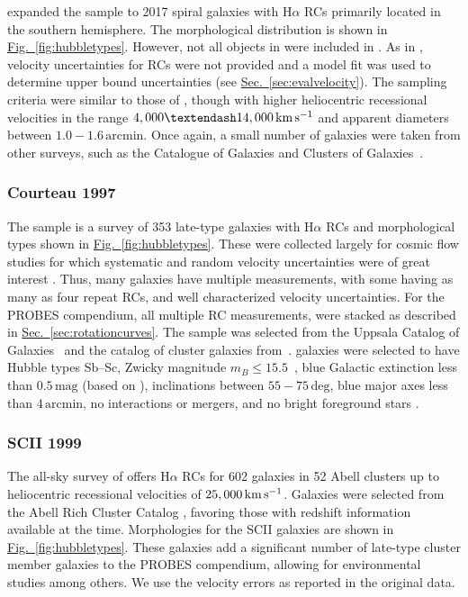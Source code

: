 \documentclass[twocolumn]{aastex631}
\newcommand{\Sec}[1]{{\protect\hyperref[sec:#1]{Sec.~\ref*{sec:#1}}}}
\newcommand{\Fig}[1]{{\protect\hyperref[fig:#1]{Fig.~\ref*{fig:#1}}}}
\newcommand{\Ha}{H\ensuremath{\alpha}\xspace}
\newcommand{\wunits}[2]{\ensuremath{#1\,\text{#2}}}
\begin{document}
\citet{Mathewson1996} expanded the \citet{Mathewson1992} sample to 2017 spiral galaxies with \Ha RCs primarily located in the southern hemisphere.
The morphological distribution is shown in \Fig{hubbletypes}.
However, not all objects in \citet{Mathewson1992} were included in \citet{Mathewson1996}.
As in \citet{Mathewson1992}, velocity uncertainties for RCs were not provided and a model fit was used to determine upper bound uncertainties (see \Sec{evalvelocity}). 
The sampling criteria were similar to those of \citet{Mathewson1992}, though with higher heliocentric recessional velocities in the range \wunits{4,000–14,000}{km\,s$^{-1}$} and apparent diameters between \wunits{1.0-1.6}{arcmin}. 
Once again, a small number of galaxies were taken from other surveys, such as the Catalogue of Galaxies and Clusters of Galaxies~\citep{Zwicky1961,Zwicky1995}.

\subsubsection{Courteau 1997}

The \citet[][hereafter ]{Courteau1997} sample is a survey of 353 late-type galaxies with \Ha RCs and morphological types shown in \Fig{hubbletypes}. 
These were collected largely for cosmic flow studies for which systematic and random velocity uncertainties were of great interest \citep{Courteau1993}. 
Thus, many galaxies have multiple measurements, with some having as many as four repeat RCs, and well characterized velocity uncertainties. 
For the PROBES compendium, all multiple RC measurements, were stacked as described in \Sec{rotationcurves}.
The sample was selected from the Uppsala Catalog of Galaxies~\citep{Nilson1973,Lauberts1998} and the catalog of cluster galaxies from~\citep{Bothun1985}. 
 galaxies were selected to have Hubble types Sb–Sc, Zwicky magnitude $m_B\leq15.5$~\citep[see][]{Giovanelli1984}, blue Galactic extinction less than \wunits{0.5}{mag} (based on \citealt{Burstein1984}), inclinations between \wunits{55-75}{deg}, blue major axes less than \wunits{4}{arcmin}, no interactions or mergers, and no bright foreground stars \citep{Courteau1996}.

\subsubsection{SCII 1999}

The all-sky survey of \citet[][hereafter SCII]{Dale1999} offers \Ha RCs for 602 galaxies in 52 Abell clusters up to heliocentric recessional velocities of \wunits{25,000}{km\,s$^{-1}$}. 
Galaxies were selected from the Abell Rich Cluster Catalog \citep{Abell1989}, favoring those with redshift information available at the time.
Morphologies for the SCII galaxies are shown in \Fig{hubbletypes}.
These galaxies add a significant number of late-type cluster member galaxies to the PROBES compendium, allowing for environmental studies among others.
We use the velocity errors as reported in the original data.
\end{document}
